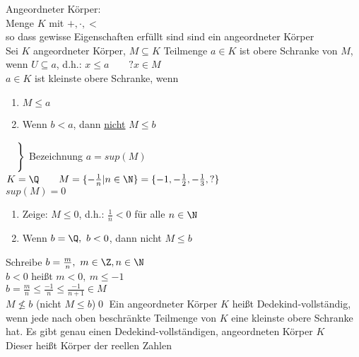 Angeordneter Körper:\\
Menge $K$ mit $+, ·, <$\\
so dass gewisse Eigenschaften erfüllt sind
\bsp
\Q{} sind ein angeordneter Körper\\
Sei $K$ angeordneter Körper, $M\subseteq K$ Teilmenge $a\in K$ ist obere Schranke von $M$, wenn $U\subseteq a$, d.h.: $x\leq a\qquad ?x\in M$\\
$a\in K$ ist kleinste obere Schranke, wenn\\
\begin{enumerate}
\item{$M\leq a$}
\item{Wenn $b < a$, dann \underline{nicht} $M\leq b$}
\end{enumerate}
\vspace*{-9.5ex}\hspace*{15.5em}
$\left.
\begin{array}{l}
{}\vspace*{2ex}\\{}
\end{array}
\right\}$
\vspace*{-5ex}Bezeichnung $a=sup(M)$
\vspace*{5ex}
%
\bsp
$K=\Q\qquad M=\{-\frac{1}{n}|n\in\N\}=\{-1,-\frac{1}{2},-\frac{1}{3},?\}$\\
$sup(M)=0$
\bew
\begin{enumerate}
\item {Zeige: $M \leq 0$, d.h.: $\frac{1}{n}<0$ für alle $n\in\N$\ok}
\item {Wenn $b=\Q,\ b<0$, dann nicht $M\leq b$}
\end{enumerate}
Schreibe $b=\frac{m}{n},\ m\in\Z, n\in\N$\\[1ex]
$b<0$ heißt $m<0,\ m\leq -1$\\[1ex]
$b=\frac{m}{n} \leq \frac{-1}{n} \leq \frac{-1}{n+1}\in M$\\[1ex]
\Rarr{} $M\not\leq b$ (nicht $M\leq b$)\qed
%
\Def
Ein angeordneter Körper $K$ heißt Dedekind-vollständig, wenn jede nach oben beschränkte Teilmenge von $K$ eine kleinste obere Schranke hat.
\Satz
Es gibt genau einen Dedekind-vollständigen, angeordneten Körper $K$\\
Dieser heißt Körper der reellen Zahlen\\

